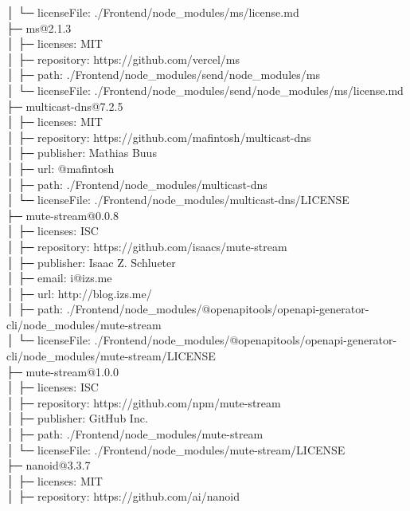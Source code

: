 \documentclass[
    paper=a4,
    twoside=false,
    parskip=half,
    listof=entryprefix,
    listof=totoc,
    index=totoc,
    bibliography=totoc,
    headsepline,
]{scrbook}
\begin{document}
    │  └─ licenseFile: ./Frontend/node\_modules/ms/license.md\\
    ├─ ms@2.1.3\\
    │  ├─ licenses: MIT\\
    │  ├─ repository: https://github.com/vercel/ms\\
    │  ├─ path: ./Frontend/node\_modules/send/node\_modules/ms\\
    │  └─ licenseFile: ./Frontend/node\_modules/send/node\_modules/ms/license.md\\
    ├─ multicast-dns@7.2.5\\
    │  ├─ licenses: MIT\\
    │  ├─ repository: https://github.com/mafintosh/multicast-dns\\
    │  ├─ publisher: Mathias Buus\\
    │  ├─ url: @mafintosh\\
    │  ├─ path: ./Frontend/node\_modules/multicast-dns\\
    │  └─ licenseFile: ./Frontend/node\_modules/multicast-dns/LICENSE\\
    ├─ mute-stream@0.0.8\\
    │  ├─ licenses: ISC\\
    │  ├─ repository: https://github.com/isaacs/mute-stream\\
    │  ├─ publisher: Isaac Z. Schlueter\\
    │  ├─ email: i@izs.me\\
    │  ├─ url: http://blog.izs.me/\\
    │  ├─ path: ./Frontend/node\_modules/@openapitools/openapi-generator-cli/node\_modules/mute-stream\\
    │  └─ licenseFile: ./Frontend/node\_modules/@openapitools/openapi-generator-cli/node\_modules/mute-stream/LICENSE\\
    ├─ mute-stream@1.0.0\\
    │  ├─ licenses: ISC\\
    │  ├─ repository: https://github.com/npm/mute-stream\\
    │  ├─ publisher: GitHub Inc.\\
    │  ├─ path: ./Frontend/node\_modules/mute-stream\\
    │  └─ licenseFile: ./Frontend/node\_modules/mute-stream/LICENSE\\
    ├─ nanoid@3.3.7\\
    │  ├─ licenses: MIT\\
    │  ├─ repository: https://github.com/ai/nanoid\\
\end{document}
